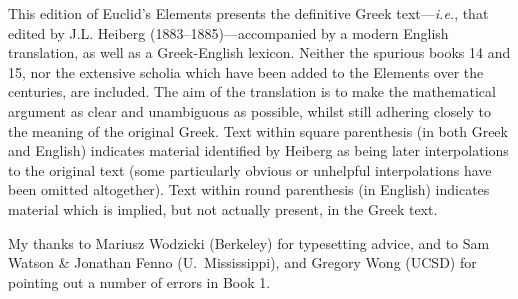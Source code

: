 This  edition of Euclid's Elements presents the definitive Greek text---{\em i.e.}, that edited by J.L. Heiberg 
(1883--1885)---accompanied by a modern English translation, as well as a Greek-English
lexicon. Neither the spurious
books 14 and 15, nor the extensive scholia which have been added to
the Elements over the centuries, are included.
The aim of the translation is to make the mathematical argument as clear and unambiguous as possible, whilst still adhering closely to  the meaning of the original Greek. Text within square parenthesis (in both Greek and English) indicates material identified by Heiberg as being later interpolations to the original text (some particularly obvious or unhelpful interpolations have been omitted  
altogether). Text within round parenthesis (in English) indicates material which is implied, but not actually present, in the Greek text. 

My thanks to Mariusz Wodzicki (Berkeley) for typesetting advice, and
to Sam Watson \& Jonathan Fenno (U.\ Mississippi), and  Gregory Wong (UCSD) for pointing out a number of errors in Book 1.